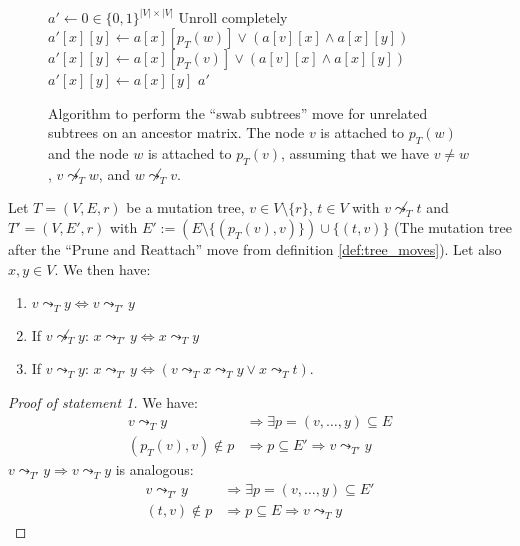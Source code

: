 \begin{figure}[p]
    \begin{algorithmic}[1]
        \State $a' \leftarrow 0 \in \{0,1\}^{|V| \times |V|}$
             \Comment Unroll completely
                    \State $a'[x][y] \leftarrow a[x][p_T(w)] \vee (a[v][x] \wedge a[x][y])$
                    \State $a'[x][y] \leftarrow a[x][p_T(v)] \vee (a[v][x] \wedge a[x][y])$
                \Else
                    \State $a'[x][y] \leftarrow a[x][y]$
                \EndIf
            \EndFor
        \EndFor
        \State \Return $a'$
        \EndFunction
    \end{algorithmic}
    \caption{Algorithm to perform the ``swab subtrees'' move for unrelated subtrees on an ancestor matrix. The node $v$ is attached to $p_T(w)$ and the node $w$ is attached to $p_T(v)$, assuming that we have $v \neq w$, $v \not\leadsto_T w$, and $w \not\leadsto_T v$.}
    \label{alg:am_swap_unrelated}
\end{figure}

\begin{lemma}
    \label{lem:prune_reattach_property}
    Let $T = (V, E, r)$ be a mutation tree, $v \in V \setminus \{r\}$, $t \in V$ with $v \not\leadsto_T t$ and $T' = (V, E', r)$ with $E' := (E \setminus \{(p_T(v), v)\}) \cup \{(t, v)\}$ (The mutation tree after the ``Prune and Reattach'' move from definition \ref{def:tree_moves}). Let also $x, y \in V$. We then have:
    \begin{enumerate}
        \item $v \leadsto_T y \Leftrightarrow v \leadsto_{T'} y$
        \item If $v \not\leadsto_T y$: $x \leadsto_{T'} y \Leftrightarrow x \leadsto_T y$
        \item If $v \leadsto_T y$: $x \leadsto_{T'} y \Leftrightarrow (v \leadsto_T x \leadsto_T y \vee x \leadsto_T t)$.
    \end{enumerate}
\end{lemma}


\begin{proof}[Proof of statement 1]
    We have:
    \begin{align*}
        v \leadsto_T y &\Rightarrow \exists p = (v, \dots, y) \subseteq E \\
        (p_T(v), v) \notin p &\Rightarrow p \subseteq E' \Rightarrow v \leadsto_{T'} y
    \end{align*}
    $v \leadsto_{T'} y \Rightarrow v \leadsto_T y$ is analogous:
    \begin{align*}
        v \leadsto_{T'} y &\Rightarrow \exists p = (v, \dots, y) \subseteq E' \\
        (t, v) \notin p &\Rightarrow p \subseteq E \Rightarrow v \leadsto_T y
    \end{align*}
\end{proof}

